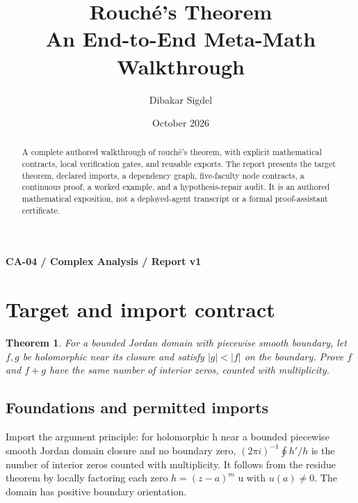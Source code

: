 \documentclass[preprint,12pt,aps,pra,showkeys,amsmath,amssymb,superscriptaddress,floatfix]{revtex4-2}
\newtheorem{theorem}{Theorem}[section]
\theoremstyle{definition}
\theoremstyle{remark}
\begin{document}
\title{Rouché's Theorem\\[4pt]\large An End-to-End Meta-Math Walkthrough}

\author{Dibakar Sigdel}


\date{October 2026}

\begin{abstract}

A complete authored walkthrough of rouché's theorem, with explicit
mathematical contracts, local verification gates, and reusable exports.
The report presents the target theorem, declared imports, a dependency
graph, five-faculty node contracts, a continuous proof, a worked
example, and a hypothesis-repair audit. It is an authored mathematical
exposition, not a deployed-agent transcript or a formal proof-assistant
certificate.

\end{abstract}\maketitle\linespread{1.12}\selectfont

\noindent\textbf{CA-04 / Complex Analysis / Report v1}

\section{Target and import contract}

\begin{theorem}

For a bounded Jordan domain with piecewise smooth boundary, let \(f,g\)
be holomorphic near its closure and satisfy \(|g|<|f|\) on the boundary.
Prove \(f\) and \(f+g\) have the same number of interior zeros, counted
with multiplicity.

\end{theorem}

\subsection{Foundations and permitted imports}

Import the argument principle: for holomorphic h near a bounded
piecewise smooth Jordan domain closure and no boundary zero,
\((2\pi i)^{-1}\oint h'/h\) is the number of interior zeros counted with
multiplicity. It follows from the residue theorem by locally factoring
each zero \(h=(z-a)^m\) u with \(u(a)\ne 0\). The domain has positive
boundary orientation.
\end{document}
